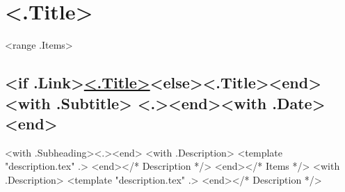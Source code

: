 \section{<.Title>}
<range .Items>
\subsection{<if .Link>\href{<.Link>}{\textbf{<.Title>}}<else>\textbf{<.Title>}<end>
<with .Subtitle> <.><end><with .Date> \hfill {}<end>}
<with .Subheading><.><end>
<with .Description>
<template "description.tex" .>
<end></* Description */>
<end></* Items */>
<with .Description>
<template "description.tex" .>
<end></* Description */>